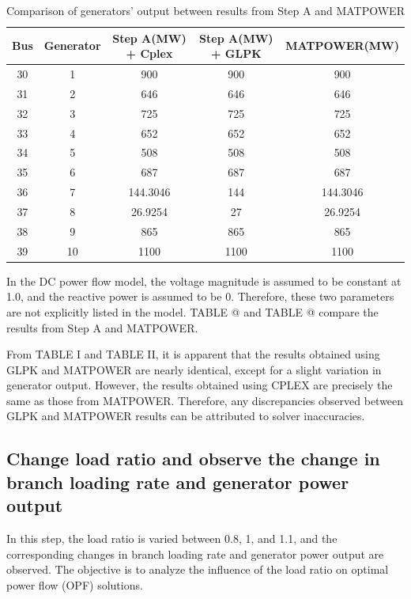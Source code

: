 \documentclass[lettersize,journal]{IEEEtran}
\makeatletter
\newcommand{\Rmnum}[1]{\expandafter\@slowromancap\romannumeral #1@}
\makeatother
\begin{document}
\begin{table}[htbp]
	\centering
	\caption{Comparison of generators' output between results from Step A and MATPOWER}
	\begin{tabular}{ccccc}
		\toprule
		Bus   & Generator & Step A(MW) + Cplex & Step A(MW) + GLPK & MATPOWER(MW) \\
		\midrule
		30    & 1     & 900   & 900   & 900 \\
		\midrule
		31    & 2     & 646   & 646   & 646 \\
		\midrule
		32    & 3     & 725   & 725   & 725 \\
		\midrule
		33    & 4     & 652   & 652   & 652 \\
		\midrule
		34    & 5     & 508   & 508   & 508 \\
		\midrule
		35    & 6     & 687   & 687   & 687 \\
		\midrule
		36    & 7     & 144.3046 & 144   & 144.3046 \\
		\midrule
		37    & 8     & 26.9254 & 27    & 26.9254 \\
		\midrule
		38    & 9     & 865   & 865   & 865 \\
		\midrule
		39    & 10    & 1100  & 1100  & 1100 \\
		\bottomrule
	\end{tabular}%
	\label{tab:addlabel}%
\end{table}%


In the DC power flow model, the voltage magnitude is assumed to be constant at 1.0, and the reactive power is assumed to be 0. Therefore, these two parameters are not explicitly listed in the model. TABLE \Rmnum{1} and TABLE \Rmnum{2} compare the results from Step A and MATPOWER.

From TABLE I and TABLE II, it is apparent that the results obtained using GLPK and MATPOWER are nearly identical, except for a slight variation in generator output. However, the results obtained using CPLEX are precisely the same as those from MATPOWER. Therefore, any discrepancies observed between GLPK and MATPOWER results can be attributed to solver inaccuracies.

\subsection{Change load ratio and observe the change in branch loading rate and generator power output}

In this step, the load ratio is varied between 0.8, 1, and 1.1, and the corresponding changes in branch loading rate and generator power output are observed. The objective is to analyze the influence of the load ratio on optimal power flow (OPF) solutions.
\end{document}
